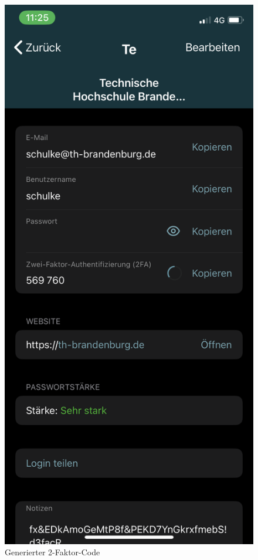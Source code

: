 \documentclass{article}
\begin{document}
\begin{figure}[H]
	\includegraphics[height=0.25\textheight]{./images/07-code.png}
	\centering
	\caption{Generierter 2-Faktor-Code}
\end{figure}
\end{document}
